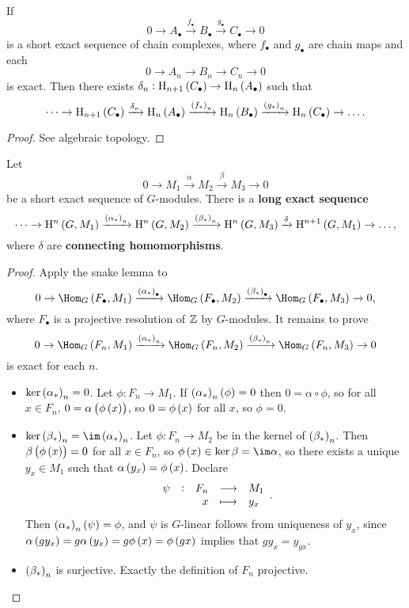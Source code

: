 
\begin{lemma}
If
$$ 0 \to A_\bullet \xrightarrow{f_\bullet} B_\bullet \xrightarrow{g_\bullet} C_\bullet \to 0 $$
is a short exact sequence of chain complexes, where $ f_\bullet $ and $ g_\bullet $ are chain maps and each
$$ 0 \to A_n \to B_n \to C_n \to 0 $$
is exact. Then there exists $ \delta_n : \H_{n + 1}\br{C_\bullet} \to \H_n\br{A_\bullet} $ such that
$$ \dots \to \H_{n + 1}\br{C_\bullet} \xrightarrow{\delta_n} \H_n\br{A_\bullet} \xrightarrow{\br{f_*}_n} \H_n\br{B_\bullet} \xrightarrow{\br{g_*}_n} \H_n\br{C_\bullet} \to \dots. $$
\end{lemma}

\begin{proof}
See algebraic topology.
\end{proof}

\pagebreak

\begin{proposition}
Let
$$ 0 \to M_1 \xrightarrow{\alpha} M_2 \xrightarrow{\beta} M_3 \to 0 $$
be a short exact sequence of $ G $-modules. There is a \textbf{long exact sequence}
$$ \dots \to \H^n\br{G, M_1} \xrightarrow{\br{\alpha_*}_n} \H^n\br{G, M_2} \xrightarrow{\br{\beta_*}_n} \H^n\br{G, M_3} \xrightarrow{\delta} \H^{n + 1}\br{G, M_1} \to \dots, $$
where $ \delta $ are \textbf{connecting homomorphisms}.
\end{proposition}

\begin{proof}
Apply the snake lemma to
$$ 0 \to \Hom_G\br{F_\bullet, M_1} \xrightarrow{\br{\alpha_*}_\bullet} \Hom_G\br{F_\bullet, M_2} \xrightarrow{\br{\beta_*}_\bullet} \Hom_G\br{F_\bullet, M_3} \to 0, $$
where $ F_\bullet $ is a projective resolution of $ \mathbb{Z} $ by $ G $-modules. It remains to prove
$$ 0 \to \Hom_G\br{F_n, M_1} \xrightarrow{\br{\alpha_*}_n} \Hom_G\br{F_n, M_2} \xrightarrow{\br{\beta_*}_n} \Hom_G\br{F_n, M_3} \to 0 $$
is exact for each $ n $.
\begin{itemize}
\item $ \ker \br{\alpha_*}_n = 0 $. Let $ \phi : F_n \to M_1 $. If $ \br{\alpha_*}_n\br{\phi} = 0 $ then $ 0 = \alpha \circ \phi $, so for all $ x \in F_n $, $ 0 = \alpha\br{\phi\br{x}} $, so $ 0 = \phi\br{x} $ for all $ x $, so $ \phi = 0 $.
\item $ \ker \br{\beta_*}_n = \im \br{\alpha_*}_n $. Let $ \phi : F_n \to M_2 $ be in the kernel of $ \br{\beta_*}_n $. Then $ \beta\br{\phi\br{x}} = 0 $ for all $ x \in F_n $, so $ \phi\br{x} \in \ker \beta = \im \alpha $, so there exists a unique $ y_x \in M_1 $ such that $ \alpha\br{y_x} = \phi\br{x} $. Declare
$$ \function[\psi]{F_n}{M_1}{x}{y_x}. $$
Then $ \br{\alpha_*}_n\br{\psi} = \phi $, and $ \psi $ is $ G $-linear follows from uniqueness of $ y_x $, since $ \alpha\br{gy_x} = g\alpha\br{y_x} = g\phi\br{x} = \phi\br{gx} $ implies that $ gy_x = y_{gx} $.
\item $ \br{\beta_*}_n $ is surjective. Exactly the definition of $ F_n $ projective.
\end{itemize}
\end{proof}

